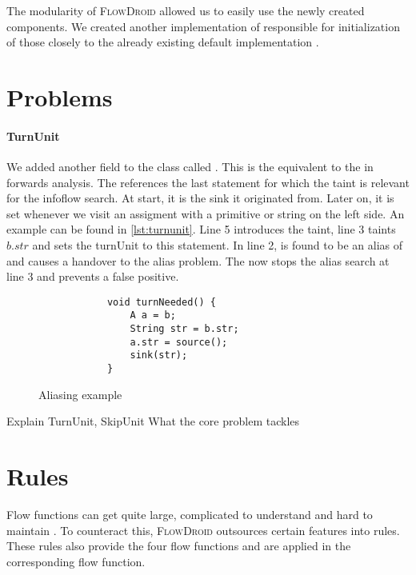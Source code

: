 \documentclass[../draft.tex]{subfiles}
\begin{document}
    The modularity of \textsc{FlowDroid} allowed us to easily use the newly created components. We created another implementation of  responsible for initialization of those closely to the already existing default implementation .

    \section{Problems}\label{s:problems}

    \paragraph{TurnUnit} We added another field to the  class called . This is the equivalent to the  in forwards analysis. The  references the last statement for which the taint is relevant for the infoflow search. At start, it is the sink it originated from. Later on, it is set whenever we visit an assigment with a primitive or string on the left side. An example can be found in \autoref{lst:turnunit}. Line 5 introduces the taint, line 3 taints $b.str$ and sets the turnUnit to this statement. In line 2,  is found to be an alias of  and causes a handover to the alias problem. The  now stops the alias search at line 3 and prevents a false positive.

    \begin{figure}[ht]
        \centering
        \begin{lstlisting}
            void turnNeeded() {
                A a = b;
                String str = b.str;
                a.str = source();
                sink(str);
            }
        \end{lstlisting}
        \caption{Aliasing example}
        \label{lst:turnunit}
    \end{figure}


    Explain TurnUnit, SkipUnit
    What the core problem tackles

    \section{Rules}
    Flow functions can get quite large, complicated to understand and hard to maintain \cite{Lerch2015}. To counteract this, \textsc{FlowDroid} outsources certain features into rules. These rules also provide the four flow functions and are applied in the corresponding flow function.
\end{document}
